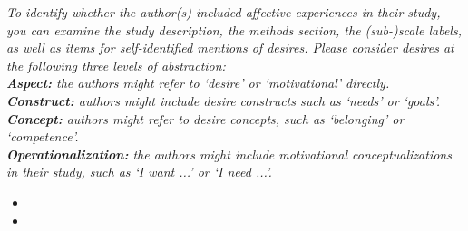 \documentclass[10pt,a4paper]{protocol}
\begin{document}
\textit{To identify whether the author(s) included affective experiences in their study, you can examine the study description, the methods section, the (sub-)scale labels, as well as items for self-identified mentions of desires. Please consider desires at the following three levels of abstraction:\\
\textbf{Aspect:} the authors might refer to `desire' or `motivational' directly.\\
\textbf{Construct:} authors might include desire constructs such as `needs' or `goals'.\\
\textbf{Concept:} authors might refer to desire concepts, such as `belonging' or `competence'.\\
\textbf{Operationalization:} the authors might include motivational conceptualizations in their study, such as `I want ...' or `I need ...'.}
\vspace{0.5em}
\begin{itemize}
	\item {}
	\item {}
\end{itemize}
\divider

\end{document}
